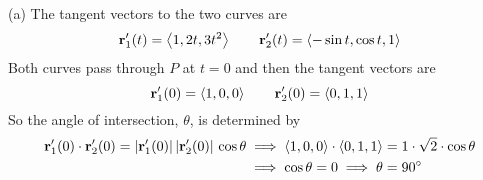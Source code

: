 \begin{solution}
(a) The tangent vectors to the two curves are
\begin{equation*}
\mathbf{r}'_1(t)=\left< 1, 2t, 3t^2\right>\qquad 
\mathbf{r}'_2(t)=\left<-\sin t, \cos t, 1\right>
\end{equation*}
Both curves pass through $P$ at $t=0$ and then the tangent vectors are
\begin{equation*}
\mathbf{r}'_1(0)=\left< 1, 0, 0\right>\qquad 
\mathbf{r}'_2(0)=\left< 0, 1, 1\right>
\end{equation*}
So the angle of intersection, $\theta$, is determined by
\begin{align*}
\mathbf{r}'_1(0)\cdot\mathbf{r}'_2(0)=|\mathbf{r}'_1(0)|\,|\mathbf{r}'_2(0)|\,\cos\theta
&\implies \left< 1, 0, 0\right>\cdot\left< 0, 1, 1\right>=1\cdot\sqrt{2}\cdot\cos\theta
\\
&\implies\cos\theta=0\implies \theta=90^\circ
\end{align*}


\end{solution}
